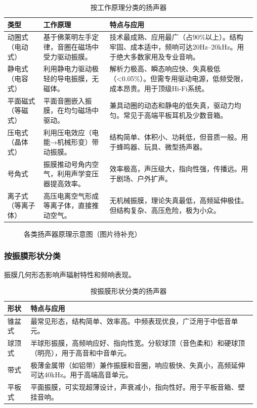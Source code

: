 \documentclass[12pt,UTF8]{ctexbook}
\begin{document}
\begin{table}[h]
\centering
\caption{按工作原理分类的扬声器}
\label{tab:speaker_principle}
\begin{tabular}{p{2.5cm}p{4.5cm}p{6.5cm}}
\toprule
\textbf{类型} & \textbf{工作原理} & \textbf{特点与应用} \\
\midrule
动圈式（电动式） & 基于佛莱明左手定律，音圈在磁场中受力驱动振膜。 & 技术最成熟、应用最广（占90\%以上）。结构牢固、成本适中，频响可达20Hz--20kHz。用于绝大多数家用及专业音响。 \\
静电式（电容式） & 利用静电力驱动极轻的导电振膜，无磁体。 & 解析力极高、瞬态响应快、失真极低（<0.05\%）。但需专用驱动电源，低频受限，成本昂贵。用于顶级Hi-Fi系统。 \\
平面磁式（等磁式） & 平面音圈嵌入振膜，在均匀磁场中驱动。 & 兼具动圈的动态和静电的低失真，驱动力均匀。常见于高端平板耳机及少数音箱。 \\
压电式（晶体式） & 利用压电效应（电能→机械形变）带动振膜。 & 结构简单、体积小、功耗低，但音质一般。用于蜂鸣器、玩具、微型扬声器。 \\
号角式 & 振膜推动号角内空气，利用声学变压器提高效率。 & 效率极高，声压级大，指向性强，传播远。用于剧场、户外扩声。 \\
离子式（等离子体） & 高压电离空气形成等离子体，直接推动空气。 & 无机械振膜，理论失真最低，高频延伸极佳。但结构复杂、高压危险，极为小众。 \\
\bottomrule
\end{tabular}
\end{table}
	
	\begin{figure}[h]
		\centering
		\caption{各类扬声器原理示意图（图片待补充）}
		\label{fig:speaker_principle}
	\end{figure}
	
\subsubsection{按振膜形状分类}

振膜几何形态影响声辐射特性和频响表现。
	
\begin{table}[h]
\centering
\caption{按振膜形状分类的扬声器}
\begin{tabular}{p{3cm}p{8cm}}
\toprule
\textbf{形状} & \textbf{特点与应用} \\
\midrule
锥盆式 & 最常见形态，结构简单、效率高。中频表现优良，广泛用于中低音单元。 \\
球顶式 & 半球形振膜，高频响应好、指向性宽。分软球顶（音色柔和）和硬球顶（明亮），用于高音和中音单元。 \\
带式 & 极薄金属带（如铝带）兼作振膜和音圈，响应极快、失真小，高频延伸可达40kHz。用于高端高音单元。 \\
平板式 & 平面振膜，可实现超薄设计，声衰减小，指向性好。用于平板音箱、壁挂音响。 \\
\bottomrule
\end{tabular}
\end{table}
	
\end{document}
